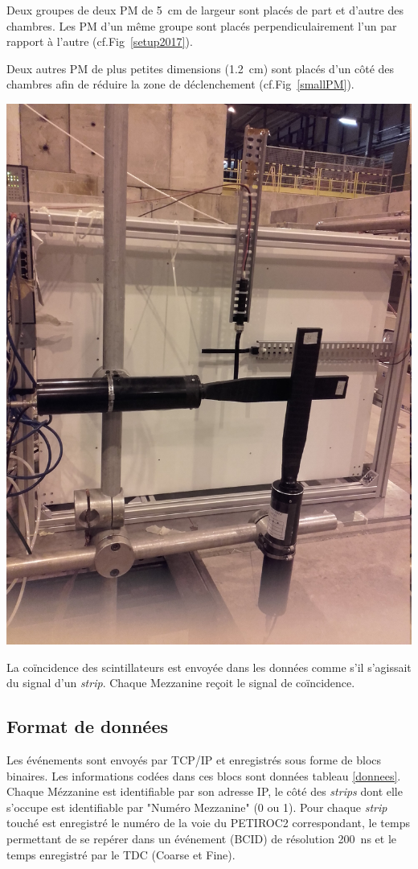 Deux groupes de deux PM de \SI{5}{\centi\meter} de largeur sont placés de part et d'autre des chambres. Les PM d'un même groupe sont placés perpendiculairement l'un par rapport à l'autre (cf.Fig~\ref{setup2017}). 

Deux autres PM de plus petites dimensions (\SI{1.2}{\centi\meter}) sont placés d'un côté des chambres afin de réduire la zone de déclenchement (cf.Fig~\ref{smallPM}).  

\marginpar
{
	\centering
	\includegraphics[width=\marginparwidth]{ELE/BigSmallScintillators.jpg}
	\label{smallPM}
}

La coïncidence des scintillateurs est envoyée dans les données comme s'il s'agissait du signal d'un \textit{strip}. Chaque Mezzanine reçoit le signal de coïncidence.
\vspace*{-0.4cm}
\subsection{Format de données}
\vspace*{-0.4cm}
Les événements sont envoyés par TCP/IP et enregistrés sous forme de blocs binaires. Les informations codées dans ces blocs sont données tableau \ref{donnees}. Chaque Mézzanine est identifiable par son adresse IP, le côté des \textit{strips} dont elle s'occupe est identifiable par "Numéro Mezzanine" (\num{0} ou \num{1}). Pour chaque \textit{strip} touché est enregistré le numéro de la voie du PETIROC2 correspondant, le temps permettant de se repérer dans un événement (BCID) de résolution \SI{200}{\nano\second} et le temps enregistré par le TDC (Coarse et Fine).

